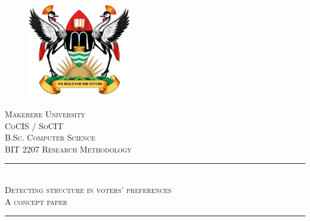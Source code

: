 \documentclass[12pt, a4paper]{report}
\begin{document}
\begin{titlepage}

\newcommand{\HRule}{\rule{\linewidth}{0.1mm}} %

\center %


\begin{figure}
    \centering
  \includegraphics[width=0.4\textwidth]{muklogo.png}
\end{figure}
 

\textsc{\LARGE Makerere University}\\[0.7cm] %
\textsc{\Large CoCIS / SoCIT}\\[0.2cm] %
\textsc{\large B.Sc. Computer Science}\\[0.1cm] %
\textsc{\small BIT 2207 Research Methodology}\\[0.8cm]


\HRule \\[0.6cm]
\textsc{\Large Detecting structure in voters' preferences}\\[0.4cm]
\small{\textsc{A concept paper}}
\HRule \\[1.0cm]
 


\end{titlepage}
\end{document}
